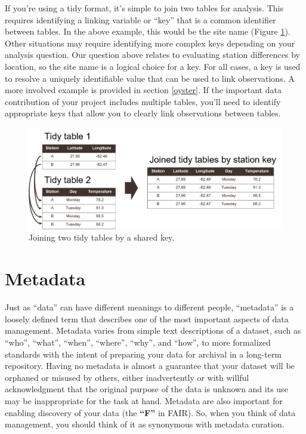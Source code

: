 \documentclass[
]{book}
\begin{document}
If you're using a tidy format, it's simple to join two tables for analysis. This requires identifying a linking variable or ``key'' that is a common identifier between tables. In the above example, this would be the site name (Figure \ref{fig:joins}). Other situations may require identifying more complex keys depending on your analysis question. Our question above relates to evaluating station differences by location, so the site name is a logical choice for a key. For all cases, a key is used to resolve a uniquely identifiable value that can be used to link observations. A more involved example is provided in section \ref{oyster}. If the important data contribution of your project includes multiple tables, you'll need to identify appropriate keys that allow you to clearly link observations between tables.

\begin{figure}

{\centering \includegraphics[width=1\linewidth]{img/joins} 

}

\caption{Joining two tidy tables by a shared key.}\label{fig:joins}
\end{figure}

\hypertarget{metadatadesc}{%
\section{Metadata}\label{metadatadesc}}

Just as ``data'' can have different meanings to different people, ``metadata'' is a loosely defined term that describes one of the most important aspects of data management. Metadata varies from simple text descriptions of a dataset, such as ``who'', ``what'', ``when'', ``where'', ``why'', and ``how'', to more formalized standards with the intent of preparing your data for archival in a long-term repository. Having no metadata is almost a guarantee that your dataset will be orphaned or misused by others, either inadvertently or with willful acknowledgment that the original purpose of the data is unknown and its use may be inappropriate for the task at hand. Metadata are also important for enabling discovery of your data (the \textbf{``F''} in FAIR). So, when you think of data management, you should think of it as synonymous with metadata curation.
\end{document}
